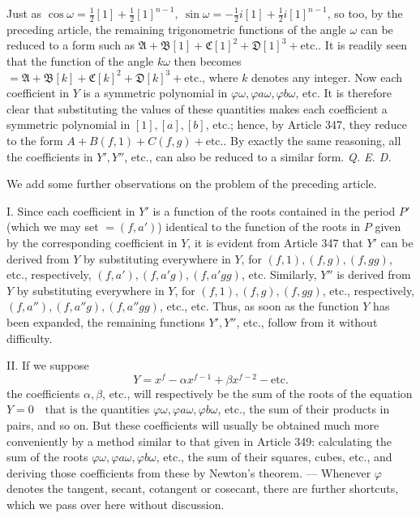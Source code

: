 Just as \(\cos\omega=\tfrac12[1]+\tfrac12[1]^{n-1},\allowbreak \ \sin\omega=-\tfrac12i[1]+\tfrac12i[1]^{n-1}\), so too, by the preceding article, the remaining trigonometric functions of the angle \(\omega\) can be reduced to a form such as \(\mathfrak A+\mathfrak B[1]+\mathfrak C[1]^2+\mathfrak D[1]^3+\text{etc.}\). It is readily seen that the function of the angle \(k\omega\) then becomes \(=\mathfrak A+\mathfrak B[k]+\mathfrak C[k]^2+\mathfrak D[k]^3+\text{etc.}\), where \(k\) denotes any integer. Now each coefficient in \(Y\) is a symmetric polynomial in \(\varphi\omega,\allowbreak \varphi a\omega,\allowbreak \varphi b\omega\), etc. It is therefore clear that substituting the values of these quantities makes each coefficient a symmetric polynomial in \([1],\allowbreak [a],\allowbreak [b]\), etc.; hence, by Article 347, they reduce to the form \(A+B(f,1)+C(f,g)+\text{etc.}\). By exactly the same reasoning, all the coefficients in \(Y',\allowbreak Y''\), etc., can also be reduced to a similar form. \textit{Q. E. D.}

We add some further observations on the problem of the preceding article.

I. Since each coefficient in \(Y'\) is a function of the roots contained in the period \(P'\) (which we may set \(=(f,a')\)) identical to the function of the roots in \(P\) given by the corresponding coefficient in \(Y\), it is evident from Article 347 that \(Y'\) can be derived from \(Y\) by substituting everywhere in \(Y\), for \((f,1),\allowbreak (f,g),\allowbreak (f,gg)\), etc., respectively, \((f,a'),\allowbreak (f,a'g),\allowbreak (f,a'gg)\), etc. Similarly, \(Y''\) is derived from \(Y\) by substituting everywhere in \(Y\), for \((f,1),\allowbreak (f,g),\allowbreak (f,gg)\), etc., respectively, \((f,a''),\allowbreak (f,a''g),\allowbreak (f,a''gg)\), etc., etc. Thus, as soon as the function \(Y\) has been expanded, the remaining functions \(Y',\allowbreak Y''\), etc., follow from it without difficulty.

II. If we suppose \[Y=x^f-\alpha x^{f-1}+\beta x^{f-2}-\text{etc.}\] the coefficients \(\alpha,\allowbreak \beta\), etc., will respectively be the sum of the roots of the equation \(Y=0\quad \text{that is}\) the quantities \(\varphi\omega,\allowbreak \varphi a\omega,\allowbreak \varphi b\omega\), etc., the sum of their products in pairs, and so on. But these coefficients will usually be obtained much more conveniently by a method similar to that given in Article 349: calculating the sum of the roots \(\varphi\omega,\allowbreak \varphi a\omega,\allowbreak \varphi b\omega\), etc., the sum of their squares,
cubes, etc., and deriving those coefficients from these by Newton's theorem. — Whenever \(\varphi\) denotes the tangent, secant, cotangent or cosecant, there are further shortcuts, which we pass over here without discussion.

